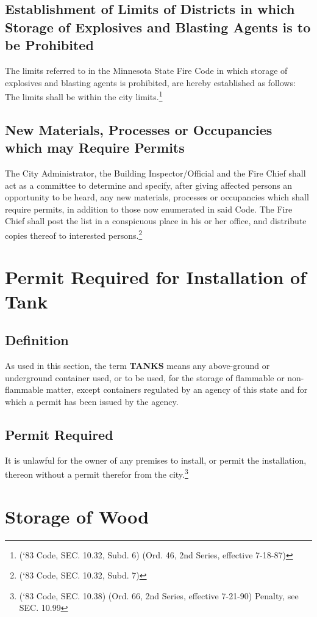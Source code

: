 \subsection{Establishment of Limits of Districts in which Storage of Explosives and Blasting Agents is to be Prohibited}
The limits referred to in the Minnesota State Fire Code in which storage of explosives and blasting agents is prohibited, are hereby established as follows: The limits shall be within the city limits.\footnote{(‘83 Code, SEC. 10.32, Subd. 6)  (Ord. 46, 2nd Series, effective 7-18-87)}
\subsection{New Materials, Processes or Occupancies which may Require Permits}
The City Administrator, the Building Inspector/Official and the Fire Chief shall act as a committee to determine and specify, after giving affected persons an opportunity to be heard, any new materials, processes or occupancies which shall require permits, in addition to those now enumerated in said Code. The Fire Chief shall post the list in a conspicuous place in his or her office, and distribute copies thereof to interested persons.\footnote{(‘83 Code, SEC. 10.32, Subd. 7)}


\setcounter{section}{14}
\section{Permit Required for Installation of Tank}
\subsection{Definition}
As used in this section, the term \textbf{TANKS} means any above-ground or underground container used, or to be used, for the storage of flammable or non-flammable matter, except containers regulated by an agency of this state and for which a permit has been issued by the agency.
\subsection{Permit Required}
It is unlawful for the owner of any premises to install, or permit the installation, thereon without a permit therefor from the city.\footnote{(‘83 Code, SEC. 10.38)  (Ord. 66, 2nd Series, effective 7-21-90)  Penalty, see SEC. 10.99}

\section{Storage of Wood}
